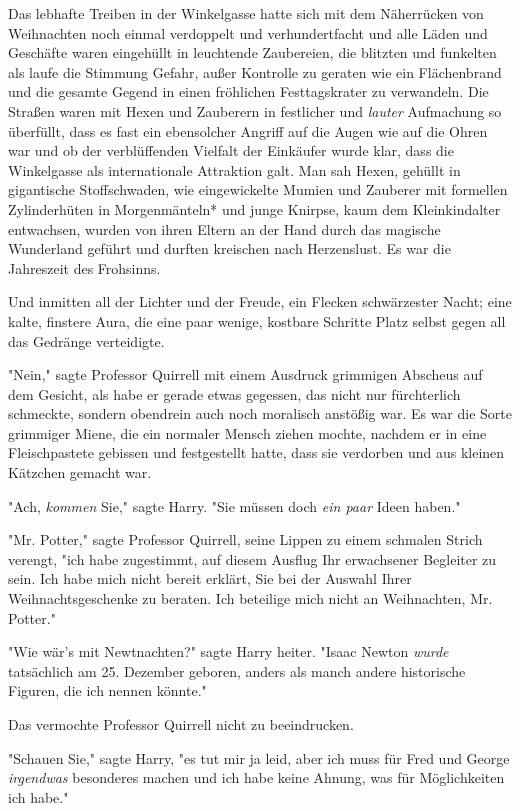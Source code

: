 {Das lebhafte Treiben in der Winkelgasse hatte sich mit dem Näherrücken von Weihnachten noch einmal verdoppelt und verhundertfacht und alle Läden und Geschäfte waren eingehüllt in leuchtende Zaubereien, die blitzten und funkelten als laufe die Stimmung Gefahr, außer Kontrolle zu geraten wie ein Flächenbrand und die gesamte Gegend in einen fröhlichen Festtagskrater zu verwandeln. Die Straßen waren mit Hexen und Zauberern in festlicher und \emph{lauter} Aufmachung so überfüllt, dass es fast ein ebensolcher Angriff auf die Augen wie auf die Ohren war und ob der verblüffenden Vielfalt der Einkäufer wurde klar, dass die Winkelgasse als internationale Attraktion galt. Man sah Hexen, gehüllt in gigantische Stoffschwaden, wie eingewickelte Mumien und Zauberer mit formellen Zylinderhüten in Morgenmänteln* und junge Knirpse, kaum dem Kleinkindalter entwachsen, wurden von ihren Eltern an der Hand durch das magische Wunderland geführt und durften kreischen nach Herzenslust. Es war die Jahreszeit des Frohsinns.

Und inmitten all der Lichter und der Freude, ein Flecken schwärzester Nacht; eine kalte, finstere Aura, die eine paar wenige, kostbare Schritte Platz selbst gegen all das Gedränge verteidigte.

"Nein," sagte Professor Quirrell mit einem Ausdruck grimmigen Abscheus auf dem Gesicht, als habe er gerade etwas gegessen, das nicht nur fürchterlich schmeckte, sondern obendrein auch noch moralisch anstößig war. Es war die Sorte grimmiger Miene, die ein normaler Mensch ziehen mochte, nachdem er in eine Fleischpastete gebissen und festgestellt hatte, dass sie verdorben und aus kleinen Kätzchen gemacht war.

"Ach, \emph{kommen} Sie," sagte Harry. "Sie müssen doch \emph{ein paar} Ideen haben."

"Mr. Potter," sagte Professor Quirrell, seine Lippen zu einem schmalen Strich verengt, "ich habe zugestimmt, auf diesem Ausflug Ihr erwachsener Begleiter zu sein. Ich habe mich nicht bereit erklärt, Sie bei der Auswahl Ihrer Weihnachtsgeschenke zu beraten. Ich beteilige mich nicht an Weihnachten, Mr. Potter."

"Wie wär's mit Newtnachten?" sagte Harry heiter. "Isaac Newton \emph{wurde} tatsächlich am 25. Dezember geboren, anders als manch andere historische Figuren, die ich nennen könnte."

Das vermochte Professor Quirrell nicht zu beeindrucken.

"Schauen Sie," sagte Harry, "es tut mir ja leid, aber ich muss für Fred und George \emph{irgendwas} besonderes machen und ich habe keine Ahnung, was für Möglichkeiten ich habe."

}
